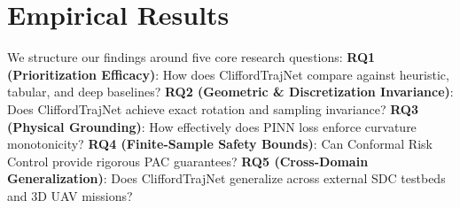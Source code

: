 \section{Empirical Results}
\label{sec:results}

We structure our findings around five core research questions: \textbf{RQ1 (Prioritization Efficacy)}: How does CliffordTrajNet compare against heuristic, tabular, and deep baselines? \textbf{RQ2 (Geometric \& Discretization Invariance)}: Does CliffordTrajNet achieve exact rotation and sampling invariance? \textbf{RQ3 (Physical Grounding)}: How effectively does PINN loss enforce curvature monotonicity? \textbf{RQ4 (Finite-Sample Safety Bounds)}: Can Conformal Risk Control provide rigorous PAC guarantees? \textbf{RQ5 (Cross-Domain Generalization)}: Does CliffordTrajNet generalize across external SDC testbeds and 3D UAV missions?

